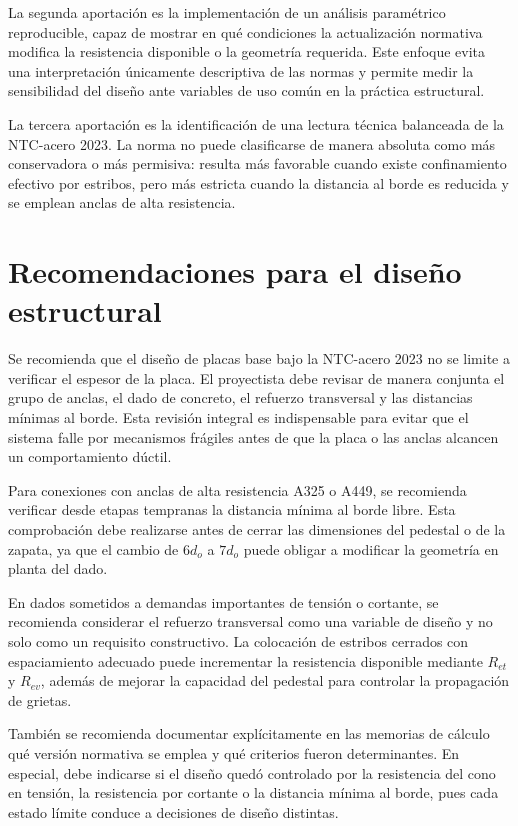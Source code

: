 La segunda aportación es la implementación de un análisis paramétrico reproducible, capaz de mostrar
en qué condiciones la actualización normativa modifica la resistencia disponible o la geometría
requerida. Este enfoque evita una interpretación únicamente descriptiva de las normas y permite
medir la sensibilidad del diseño ante variables de uso común en la práctica estructural.

La tercera aportación es la identificación de una lectura técnica balanceada de la NTC-acero 2023. La
norma no puede clasificarse de manera absoluta como más conservadora o más permisiva: resulta más
favorable cuando existe confinamiento efectivo por estribos, pero más estricta cuando la distancia al
borde es reducida y se emplean anclas de alta resistencia.

\section{Recomendaciones para el diseño estructural}

Se recomienda que el diseño de placas base bajo la NTC-acero 2023 no se limite a verificar el espesor
de la placa. El proyectista debe revisar de manera conjunta el grupo de anclas, el dado de concreto,
el refuerzo transversal y las distancias mínimas al borde. Esta revisión integral es indispensable
para evitar que el sistema falle por mecanismos frágiles antes de que la placa o las anclas alcancen
un comportamiento dúctil.

Para conexiones con anclas de alta resistencia A325 o A449, se recomienda verificar desde etapas
tempranas la distancia mínima al borde libre. Esta comprobación debe realizarse antes de cerrar las
dimensiones del pedestal o de la zapata, ya que el cambio de $6d_o$ a $7d_o$ puede obligar a
modificar la geometría en planta del dado.

En dados sometidos a demandas importantes de tensión o cortante, se recomienda considerar el
refuerzo transversal como una variable de diseño y no solo como un requisito constructivo. La
colocación de estribos cerrados con espaciamiento adecuado puede incrementar la resistencia
disponible mediante $R_{et}$ y $R_{ev}$, además de mejorar la capacidad del pedestal para controlar
la propagación de grietas.

También se recomienda documentar explícitamente en las memorias de cálculo qué versión normativa se
emplea y qué criterios fueron determinantes. En especial, debe indicarse si el diseño quedó
controlado por la resistencia del cono en tensión, la resistencia por cortante o la distancia mínima
al borde, pues cada estado límite conduce a decisiones de diseño distintas.

